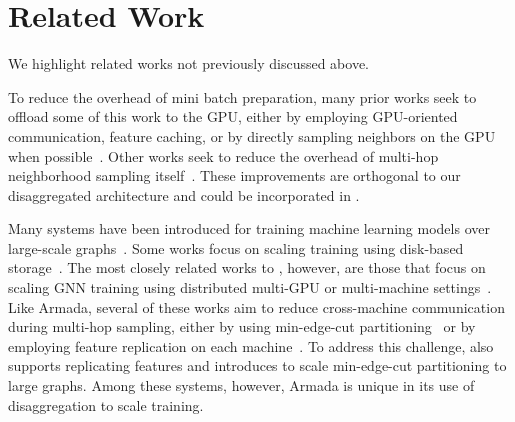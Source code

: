 \section{Related Work}
\label{sec:related_work}
We highlight related works not previously discussed above.

To reduce the overhead of mini batch preparation, many prior works seek to offload some of this work to the GPU, either by employing GPU-oriented communication, feature caching, or by directly sampling neighbors on the GPU when possible~\cite{largegcn, min2021pytorchdirect, salient, pagraph, dong2021global, nextdoor}. Other works seek to reduce the overhead of multi-hop neighborhood sampling itself~\cite{graphsage, chen2018fastgcn, zou2019layer, lazygcn, zeng2020graphsaint, clustergcn}. These improvements are orthogonal to our disaggregated architecture and could be incorporated in \systemname. 

Many systems have been introduced for training machine learning models over large-scale graphs~\cite{p3gnn, MLSYS2020_ROC, pyg, aligraph, pagraph, dong2021global, gnnsurvey, zheng2020dglke}. Some works focus on scaling training using disk-based storage~\cite{mohoney2021marius, partitioning, pytorchbiggraph}. The most closely related works to \systemname, however, are those that focus on scaling GNN training using distributed multi-GPU or multi-machine settings~\cite{p3gnn, MLSYS2020_ROC, aligraph, wang2021flexgraph}. Like Armada, several of these works aim to reduce cross-machine communication during multi-hop sampling, either by using min-edge-cut partitioning~\cite{distdglv2} or by employing feature replication on each machine~\cite{liu2023bgl, salient++}. To address this challenge, \systemname also supports replicating features and introduces \partitioning to scale min-edge-cut partitioning to large graphs. Among these systems, however, Armada is unique in its use of disaggregation to scale training.